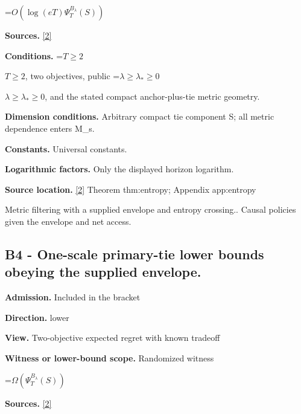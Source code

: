 \documentclass[10pt,a4paper]{article}
\newcommand{\AtlasMath}[1]{\par\begingroup\centering\setbox0=\hbox{$\displaystyle #1$}\ifdim\wd0>1.4\linewidth\typeout{ATLAS WIDE FORMULA: \the\wd0}\fi\ifdim\wd0>\linewidth\resizebox{\linewidth}{!}{\box0}\else\box0\fi\par\endgroup}
\newcommand{\AtlasInlineMath}[1]{\begingroup\setbox0=\hbox{$#1$}\ifdim\wd0>.4\linewidth\endgroup\AtlasMath{#1}\else\endgroup$#1$\fi}
\begin{document}
\AtlasMath{O(\log(eT)\Psi_T^{B_\lambda}(S))}


\textbf{Sources.} \href{https://github.com/WU-Wendao/Colombo/blob/main/colombo_sensorium/Complexity_altas/data/sources/colombo/U07/manuscript.pdf}{[2]}



\textbf{Conditions.} \AtlasInlineMath{T\ge2}, two objectives, public \AtlasInlineMath{\lambda\ge\lambda_*\ge0}, and the stated compact anchor-plus-tie metric geometry.



\textbf{Dimension conditions.} Arbitrary compact tie component S; all metric dependence enters M\_s.



\textbf{Constants.} Universal constants.



\textbf{Logarithmic factors.} Only the displayed horizon logarithm.



\textbf{Source location.} \href{https://github.com/WU-Wendao/Colombo/blob/main/colombo_sensorium/Complexity_altas/data/sources/colombo/U07/manuscript.pdf}{[2]} Theorem thm:entropy; Appendix app:entropy



Metric filtering with a supplied envelope and entropy crossing.. Causal policies given the envelope and net access.



\subsection{B4 - One-scale primary-tie lower bounds obeying the supplied envelope.}


\textbf{Admission.} Included in the bracket



\textbf{Direction.} lower



\textbf{View.} Two-objective expected regret with known tradeoff



\textbf{Witness or lower-bound scope.} Randomized witness



\AtlasMath{\Omega(\Psi_T^{B_\lambda}(S))}


\textbf{Sources.} \href{https://github.com/WU-Wendao/Colombo/blob/main/colombo_sensorium/Complexity_altas/data/sources/colombo/U07/manuscript.pdf}{[2]}
\end{document}
